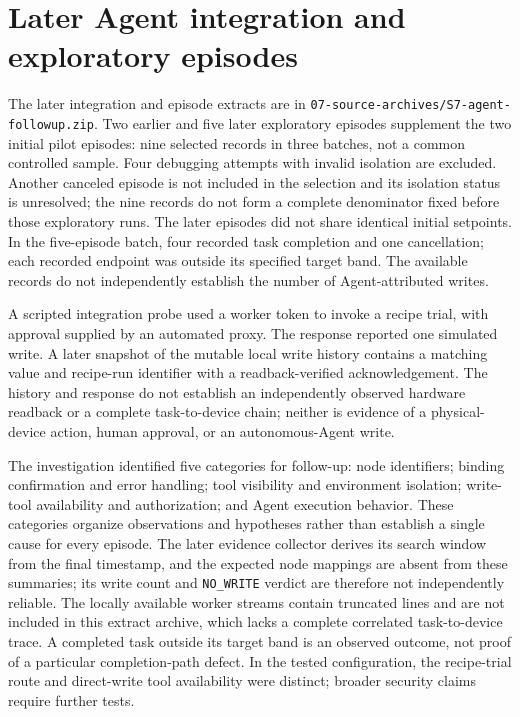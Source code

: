 \documentclass[10pt]{article}
\begin{document}
\section*{Later Agent integration and exploratory episodes}
The later integration and episode extracts are in \texttt{07-source-archives/S7-agent-followup.zip}. Two earlier and five later exploratory episodes supplement the two initial pilot episodes: nine selected records in three batches, not a common controlled sample. Four debugging attempts with invalid isolation are excluded. Another canceled episode is not included in the selection and its isolation status is unresolved; the nine records do not form a complete denominator fixed before those exploratory runs. The later episodes did not share identical initial setpoints. In the five-episode batch, four recorded task completion and one cancellation; each recorded endpoint was outside its specified target band. The available records do not independently establish the number of Agent-attributed writes.

A scripted integration probe used a worker token to invoke a recipe trial, with approval supplied by an automated proxy. The response reported one simulated write. A later snapshot of the mutable local write history contains a matching value and recipe-run identifier with a readback-verified acknowledgement. The history and response do not establish an independently observed hardware readback or a complete task-to-device chain; neither is evidence of a physical-device action, human approval, or an autonomous-Agent write.

The investigation identified five categories for follow-up: node identifiers; binding confirmation and error handling; tool visibility and environment isolation; write-tool availability and authorization; and Agent execution behavior. These categories organize observations and hypotheses rather than establish a single cause for every episode. The later evidence collector derives its search window from the final timestamp, and the expected node mappings are absent from these summaries; its write count and \texttt{NO\_WRITE} verdict are therefore not independently reliable. The locally available worker streams contain truncated lines and are not included in this extract archive, which lacks a complete correlated task-to-device trace. A completed task outside its target band is an observed outcome, not proof of a particular completion-path defect. In the tested configuration, the recipe-trial route and direct-write tool availability were distinct; broader security claims require further tests.
\end{document}
